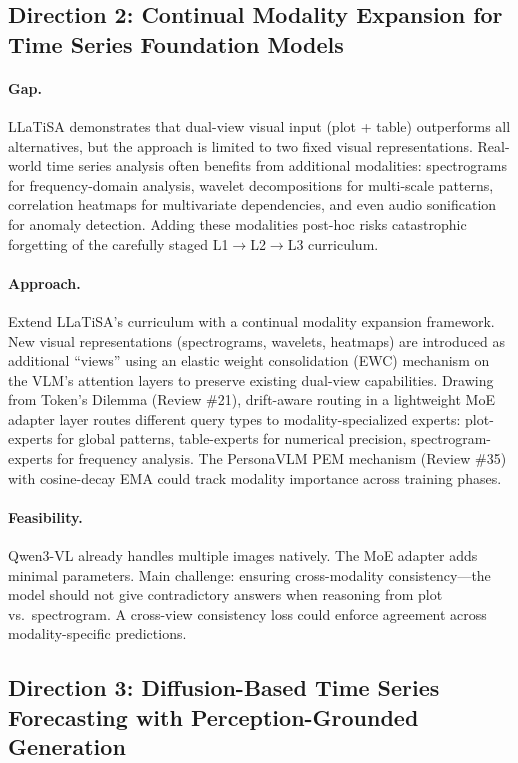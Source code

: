 \documentclass[11pt]{article}
\begin{document}
\subsection{Direction 2: Continual Modality Expansion for Time Series Foundation Models}

\paragraph{Gap.}
LLaTiSA demonstrates that dual-view visual input (plot + table) outperforms all alternatives, but the approach is limited to two fixed visual representations. Real-world time series analysis often benefits from additional modalities: spectrograms for frequency-domain analysis, wavelet decompositions for multi-scale patterns, correlation heatmaps for multivariate dependencies, and even audio sonification for anomaly detection. Adding these modalities post-hoc risks catastrophic forgetting of the carefully staged L1$\to$L2$\to$L3 curriculum.

\paragraph{Approach.}
Extend LLaTiSA's curriculum with a continual modality expansion framework. New visual representations (spectrograms, wavelets, heatmaps) are introduced as additional ``views'' using an elastic weight consolidation (EWC) mechanism on the VLM's attention layers to preserve existing dual-view capabilities. Drawing from Token's Dilemma (Review \#21), drift-aware routing in a lightweight MoE adapter layer routes different query types to modality-specialized experts: plot-experts for global patterns, table-experts for numerical precision, spectrogram-experts for frequency analysis. The PersonaVLM PEM mechanism (Review \#35) with cosine-decay EMA could track modality importance across training phases.

\paragraph{Feasibility.}
Qwen3-VL already handles multiple images natively. The MoE adapter adds minimal parameters. Main challenge: ensuring cross-modality consistency---the model should not give contradictory answers when reasoning from plot vs.\ spectrogram. A cross-view consistency loss could enforce agreement across modality-specific predictions.

\subsection{Direction 3: Diffusion-Based Time Series Forecasting with Perception-Grounded Generation}
\end{document}
